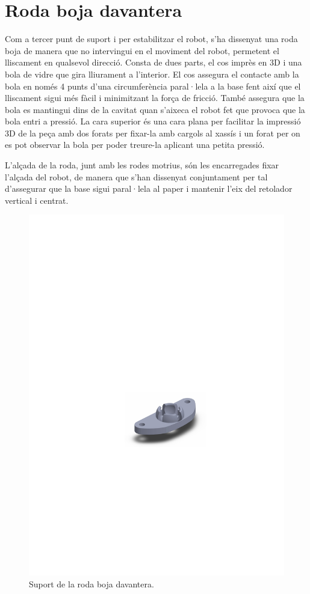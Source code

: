 \section{Roda boja davantera}

Com a tercer punt de suport i per estabilitzar el robot, s’ha dissenyat una roda boja de manera que no intervingui en el moviment del robot, permetent el lliscament en qualsevol direcció. Consta de dues parts, el cos imprès en 3D i una bola de vidre que gira lliurament a l'interior. El cos assegura el contacte amb la bola en només 4 punts d’una circumferència paral·lela a la base fent així que el lliscament sigui més fàcil i minimitzant la força de fricció. També assegura que la bola es mantingui dins de la cavitat quan s’aixeca el robot fet que provoca que la bola entri a pressió. La cara superior és una cara plana per facilitar la impressió 3D de la peça amb dos forats per fixar-la amb cargols al xassís i un forat per on es pot observar la bola per poder treure-la aplicant una petita pressió. 

L’alçada de la roda, junt amb les rodes motrius, són les encarregades fixar l’alçada del robot, de manera que s’han dissenyat conjuntament per tal d’assegurar que la base sigui paral·lela al paper i mantenir l’eix del retolador vertical i centrat. 

\begin{figure}[H]
	\centering
	\includegraphics{bolaboja}
	\caption{Suport de la roda boja davantera.}
	\label{fig:bolaboja1}
\end{figure}

